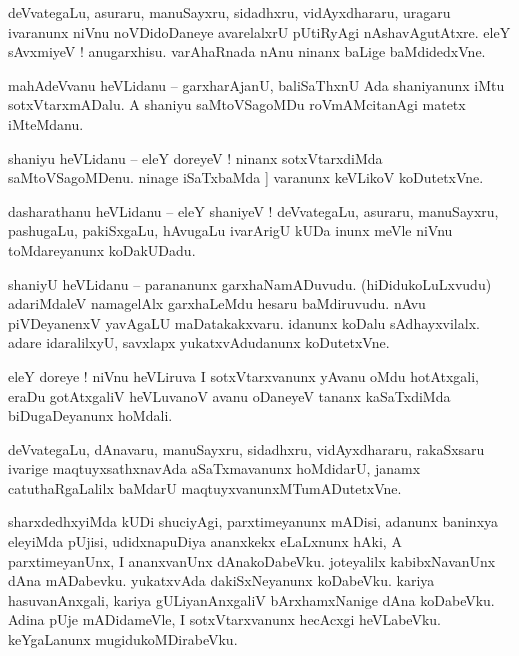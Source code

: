 \documentclass{article}
\begin{document}
\begin{mn}%
deVvategaLu, asuraru, manuSayxru, sidadhxru, vidAyxdhararu, uragaru ivaranunx niVnu noVDidoDaneye 
avarelalxrU pUtiRyAgi nAshavAgutAtxre. eleY sAvxmiyeV ! anugarxhisu. varAhaRnada nAnu ninanx 
baLige baMdidedxVne.
\end{mn}

\begin{mn}%
mahAdeVvanu heVLidanu -- garxharAjanU, baliSaThxnU Ada shaniyanunx iMtu sotxVtarxmADalu. A shaniyu 
saMtoVSagoMDu roVmAMcitanAgi matetx iMteMdanu.
\end{mn}

\begin{mn}%
shaniyu heVLidanu -- eleY doreyeV ! ninanx sotxVtarxdiMda saMtoVSagoMDenu. ninage iSaTxbaMda ]
varanunx keVLikoV koDutetxVne.
\end{mn}

\begin{mn}%
dasharathanu heVLidanu -- eleY shaniyeV ! deVvategaLu, asuraru, manuSayxru, pashugaLu, pakiSxgaLu, 
hAvugaLu ivarArigU kUDa inunx meVle niVnu toMdareyanunx koDakUDadu.
\end{mn}

\begin{mn}%
shaniyU heVLidanu -- parananunx garxhaNamADuvudu. (hiDidukoLuLxvudu) adariMdaleV namagelAlx 
garxhaLeMdu hesaru baMdiruvudu. nAvu piVDeyanenxV yavAgaLU maDatakakxvaru. idanunx koDalu 
sAdhayxvilalx. adare idaralilxyU, savxlapx yukatxvAdudanunx koDutetxVne.
\end{mn}

\begin{mn}%
eleY doreye ! niVnu heVLiruva I sotxVtarxvanunx yAvanu oMdu hotAtxgali, eraDu gotAtxgaliV 
heVLuvanoV avanu oDaneyeV tananx kaSaTxdiMda biDugaDeyanunx hoMdali.
\end{mn}

\begin{mn}%
deVvategaLu, dAnavaru, manuSayxru, sidadhxru, vidAyxdhararu, rakaSxsaru ivarige maqtuyxsathxnavAda 
aSaTxmavanunx hoMdidarU, janamx catuthaRgaLalilx baMdarU maqtuyxvanunxMTumADutetxVne.
\end{mn}

\begin{mn}%
sharxdedhxyiMda kUDi shuciyAgi, parxtimeyanunx mADisi, adanunx baninxya eleyiMda pUjisi, 
udidxnapuDiya ananxkekx eLaLxnunx hAki, A parxtimeyanUnx, I ananxvanUnx dAnakoDabeVku. joteyalilx 
kabibxNavanUnx dAna mADabevku. yukatxvAda dakiSxNeyanunx koDabeVku. kariya hasuvanAnxgali, kariya 
gULiyanAnxgaliV bArxhamxNanige dAna koDabeVku. Adina pUje mADidameVle, I sotxVtarxvanunx hecAcxgi 
heVLabeVku. keYgaLanunx mugidukoMDirabeVku.
\end{mn}
\end{document}
